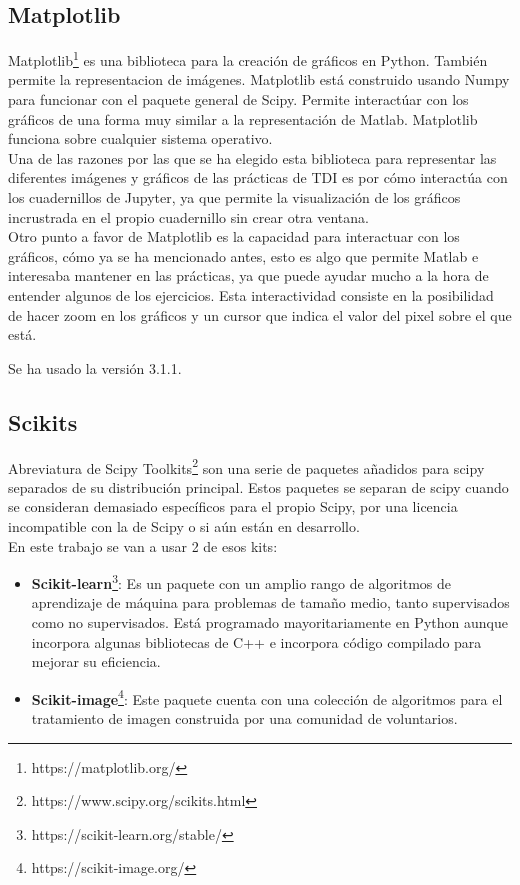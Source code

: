 \subsection{Matplotlib}

Matplotlib\footnote{https://matplotlib.org/} es una biblioteca para la creación de gráficos en Python. También permite la representacion de imágenes. Matplotlib está construido usando Numpy para funcionar con el paquete general de Scipy. Permite interactúar con los gráficos de una forma muy similar a la representación de Matlab. Matplotlib funciona sobre cualquier sistema operativo. \\

Una de las razones por las que se ha elegido esta biblioteca para representar las diferentes imágenes y gráficos de las prácticas de TDI es por cómo interactúa con los cuadernillos de Jupyter, ya que permite la visualización de los gráficos incrustrada en el propio cuadernillo sin crear otra ventana. \\

Otro punto a favor de Matplotlib es la capacidad para interactuar con los gráficos, cómo ya se ha mencionado antes, esto es algo que permite Matlab e interesaba mantener en las prácticas, ya que puede ayudar mucho a la hora de entender algunos de los ejercicios. Esta interactividad consiste en la posibilidad de hacer zoom en los gráficos y un cursor que indica el valor del pixel sobre el que está.

Se ha usado la versión 3.1.1.\\

\subsection{Scikits}

Abreviatura de Scipy Toolkits\footnote{https://www.scipy.org/scikits.html} son una serie de paquetes añadidos para scipy separados de su distribución principal. Estos paquetes se separan de scipy cuando se consideran demasiado específicos para el propio Scipy, por una licencia incompatible con la de Scipy o si aún están en desarrollo.\\

En este trabajo se van a usar 2 de esos kits:\\


\begin{itemize}

	\item \textbf{Scikit-learn}\footnote{https://scikit-learn.org/stable/}: Es un paquete con un amplio rango de algoritmos de aprendizaje de máquina para problemas de tamaño medio, tanto supervisados como no supervisados. Está programado mayoritariamente en Python aunque incorpora algunas bibliotecas de C++ e incorpora código compilado para mejorar su eficiencia.

	\item \textbf{Scikit-image}\footnote{https://scikit-image.org/}: Este paquete cuenta con una colección de algoritmos para el tratamiento de imagen construida por una comunidad de voluntarios.
\end{itemize}
